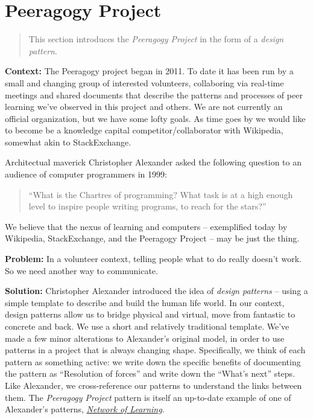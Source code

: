 \section{Peeragogy Project}

\begin{quote}
This section introduces the \emph{Peeragogy Project} in the form of a \emph{design pattern}.
\end{quote}

\textbf{Context:}  The Peeragogy project began in 2011.  To date it has been run by a small and changing group of interested volunteers, collaboring via real-time meetings and shared documents that describe the patterns and processes of peer learning we've observed in this project and others.   We are not currently an official organization, but we have some lofty goals.  As time goes by we would like to become be a knowledge capital competitor/collaborator with Wikipedia, somewhat akin to StackExchange.

Architectual maverick Christopher Alexander asked the following question to an audience of computer programmers in 1999: 
\begin{quote}
``What is the Chartres of programming? What task is at a high enough level to inspire people writing programs, to reach for the stars?''
\end{quote}
We believe that the nexus of learning and computers -- exemplified today by Wikipedia, StackExchange, and the Peeragogy Project -- may be just the thing.

\textbf{Problem:} In a volunteer context, telling people what to do really doesn't work.  So we need another way to communicate.

\textbf{Solution:} Christopher Alexander introduced the idea of \emph{design patterns} -- using a simple template to describe and build the human life world.  In our context, design patterns allow us to bridge physical and virtual, move from fantastic to concrete and back.  We use a short and relatively traditional template. We've made a few minor alterations to Alexander's original model, in order to use patterns in a project that is always changing shape.  Specifically, we think of each pattern as something active: we write down the specific benefits of documenting the pattern as ``Resolution of forces'' and write down the ``What's next'' steps.  Like Alexander, we cross-reference our patterns to understand the links between them.  The \emph{Peeragogy Project} pattern is itself an up-to-date example of one of Alexander's patterns, \href{http://en.wikipedia.org/wiki/Networked_learning#1970s}{\emph{Network of Learning}}.

